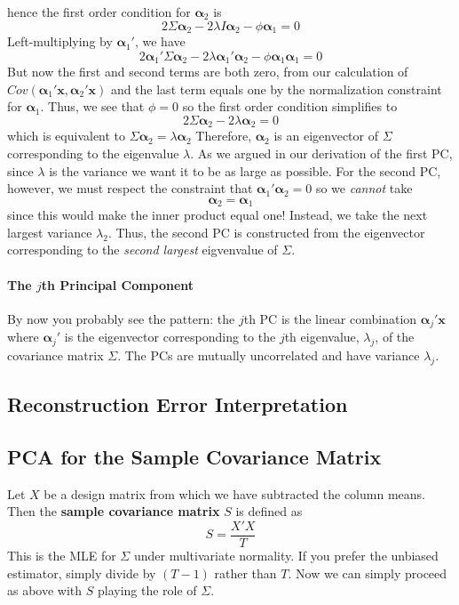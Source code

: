 hence the first order condition for $\boldsymbol{\alpha}_2$ is
	$$2\Sigma \boldsymbol{\alpha}_2 - 2\lambda I \boldsymbol{\alpha}_2 - \phi \boldsymbol{\alpha}_1 = 0$$
Left-multiplying by $\boldsymbol{\alpha}_1'$, we have
$$2 \boldsymbol{\alpha}_1'\Sigma \boldsymbol{\alpha}_2 - 2\lambda \boldsymbol{\alpha}_1'\boldsymbol{\alpha}_2 - \phi \boldsymbol{\alpha}_1\boldsymbol{\alpha}_1 = 0$$
But now the first and second terms are both zero, from our calculation of $Cov\left(\boldsymbol{\alpha}_1' \mathbf{x}, \boldsymbol{\alpha}_2' \mathbf{x} \right)$ and the last term equals one by the normalization constraint for $\boldsymbol{\alpha}_1$. Thus, we see that $\phi = 0$ so the first order condition simplifies to
	$$2\Sigma \boldsymbol{\alpha}_2 - 2\lambda  \boldsymbol{\alpha}_2 = 0$$
which is equivalent to $\Sigma \boldsymbol{\alpha}_2 = \lambda  \boldsymbol{\alpha}_2$
Therefore, $\boldsymbol{\alpha}_2$ is an eigenvector of $\Sigma$ corresponding to the eigenvalue $\lambda$. As we argued in our derivation of the first PC, since $\lambda$ is the variance we want it to be as large as possible. For the second PC, however, we must respect the constraint that $\boldsymbol{\alpha}_1'\boldsymbol{\alpha}_2  = 0$ so we \emph{cannot} take $$\boldsymbol{\alpha}_2 = \boldsymbol{\alpha}_1$$ since this would make the inner product equal one! Instead, we take the next largest variance $\lambda_2$. Thus, the second PC is constructed from the eigenvector corresponding to the \emph{second largest} eigvenvalue of $\Sigma$.

\paragraph{The $j$th Principal Component} By now you probably see the pattern: the $j$th PC is the linear combination $\boldsymbol{\alpha}_j' \mathbf{x}$ where $\boldsymbol{\alpha}_j'$ is the eigenvector corresponding to the $j$th eigenvalue, $\lambda_j$, of the covariance matrix $\Sigma$. The PCs are mutually uncorrelated and have variance $\lambda_j$.


\subsection{Reconstruction Error Interpretation}

\subsection{PCA for the Sample Covariance Matrix}
Let $X$ be a design matrix from which we have subtracted the column means. Then the \textbf{sample covariance matrix} $S$ is defined as
	$$S = \frac{X'X}{T}$$
This is the MLE for $\Sigma$ under multivariate normality. If you prefer the unbiased estimator, simply divide by $(T-1)$ rather than $T$. Now we can simply proceed as above with $S$ playing the role of $\Sigma$. 


